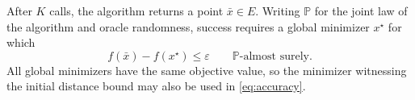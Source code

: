 \documentclass[10pt]{article}
\theoremstyle{definition}
\begin{document}
After $K$ calls, the algorithm returns a point $\bar{x}\in E$. Writing $\mathbb{P}$ for the joint law of the algorithm and oracle randomness, success requires a global minimizer $x^\star$ for which
\begin{equation}
\label{eq:accuracy}
f(\bar{x})-f(x^\star)\leq\varepsilon
\qquad \mathbb{P}\text{-almost surely}.
\end{equation}
All global minimizers have the same objective value, so the minimizer witnessing the initial distance bound may also be used in \eqref{eq:accuracy}.
\end{document}
